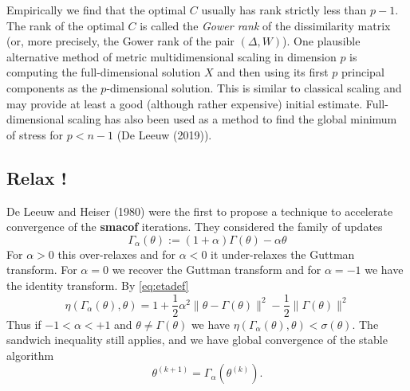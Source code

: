 \documentclass[
  12pt,
]{article}
\begin{document}
Empirically we find that the optimal \(C\) usually has rank strictly less than \(p-1\). The
rank of the optimal \(C\) is called the \emph{Gower rank} of the dissimilarity matrix (or, more
precisely, the Gower rank of the pair \((\Delta,W)\)). One plausible alternative method
of metric multidimensional scaling in dimension \(p\) is computing the full-dimensional solution \(X\)
and then using its first \(p\) principal components as the \(p\)-dimensional solution. This
is similar to classical scaling and may provide at least a good (although rather expensive)
initial estimate. Full-dimensional scaling has also been used as a method to find the
global minimum of stress for \(p<n-1\) (De Leeuw (2019)).

\subsection{Relax !}\label{relax}

De Leeuw and Heiser (1980) were the first to propose a technique to accelerate convergence of the \textbf{smacof} iterations. They considered the family of updates
\begin{equation}
\Gamma_\alpha(\theta):=(1+\alpha)\Gamma(\theta)-\alpha\theta
\label{eq:gutalp}
\end{equation}
For \(\alpha>0\) this over-relaxes and for \(\alpha<0\) it under-relaxes the Guttman transform. For \(\alpha=0\) we recover the Guttman transform and for \(\alpha=-1\) we have the identity transform.
By \eqref{eq:etadef}
\begin{equation}
\eta(\Gamma_\alpha(\theta),\theta)=1+\frac12\alpha^2\|\theta-\Gamma(\theta)\|^2-\frac12\|\Gamma(\theta)\|^2
\label{eq:etaalp}
\end{equation}
Thus if \(-1<\alpha<+1\) and \(\theta\not=\Gamma(\theta)\) we have \(\eta(\Gamma_\alpha(\theta),\theta)<\sigma(\theta)\).
The sandwich inequality still applies, and we have global convergence of the stable algorithm
\begin{equation}
\theta^{(k+1)}=\Gamma_{\alpha}(\theta^{(k)}).
\label{eq:smarel}
\end{equation}
\end{document}
